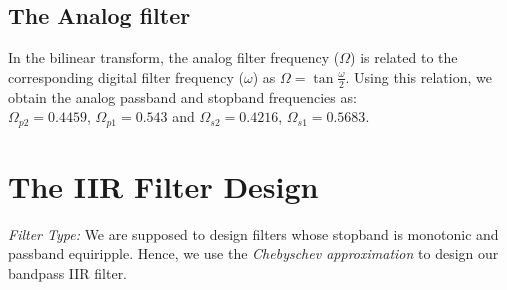 \documentclass{article}
\begin{document}
\subsection{The Analog filter}
In the bilinear transform, the analog filter frequency ($\Omega$) is related to the corresponding digital filter frequency ($\omega$) as $\Omega = \tan \frac{\omega}{2}$.  Using this relation, we obtain the analog passband and stopband frequencies as: \\$\Omega_{p2} = 0.4459$, $\Omega_{p1} = 0.543 $ and $\Omega_{s2} = 0.4216$, $\Omega_{s1} = 0.5683$.




\section{The IIR Filter Design}
{\em Filter Type:}  We are supposed to design filters whose stopband is monotonic and passband equiripple.  
Hence, we use the {\em Chebyschev approximation} to design our bandpass IIR filter.
\end{document}
